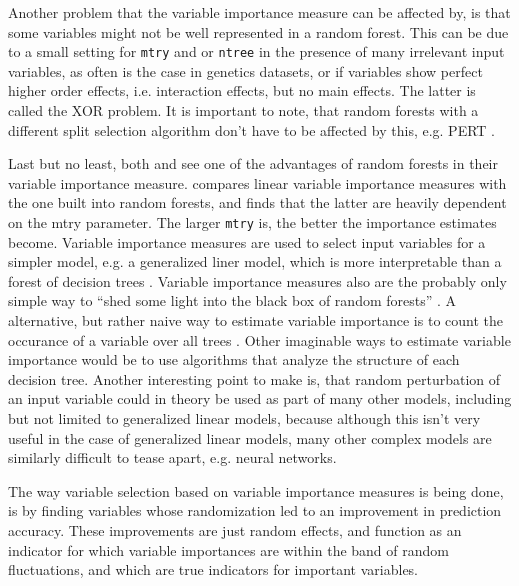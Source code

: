 \documentclass[a4paper,man,12pt,apacite,floatsintext,draftfirst]{apa6} %
\begin{document}
Another problem that the variable importance measure can be affected by,
is that some variables might not be well represented in a random forest.
This can be due to a small setting for \texttt{mtry} and or \texttt{ntree}
in the presence of many irrelevant input variables, as often is the case
in genetics datasets, or if variables show perfect higher order effects,
i.e. interaction effects, but no main effects.
The latter is called the XOR problem.
It is important to note, that random forests with a different split selection
algorithm don't have to be affected by this, e.g. PERT \cite{cutler2001pert}.

Last but no least, both \cite{strobl2009introduction} and
\cite{gromping2009variable} see one of the advantages of random forests in
their variable importance measure.
\cite{gromping2009variable} compares linear variable importance measures
with the one built into random forests, and finds that the latter are
heavily dependent on the mtry parameter.
The larger \texttt{mtry} is, the better the importance estimates become.
Variable importance measures are used to select input variables for a simpler
model, e.g. a generalized liner model, which is more interpretable than a
forest of decision trees \cite{strobl2009introduction}.
Variable importance measures also are the probably only simple way to
“shed some light into the black box of random forests”
\cite{gromping2009variable}.
A alternative, but rather naive way to estimate variable importance is to count
the occurance of a variable over all trees \cite{strobl2009introduction}.
Other imaginable ways to estimate variable importance would be to use
algorithms that analyze the structure of each decision tree.
Another interesting point to make is, that random perturbation of an input
variable could in theory be used as part of many other models, including but
not limited to generalized linear models, because although
this isn't very useful in the case of generalized linear models,
many other complex models are similarly difficult to tease apart, e.g.
neural networks.

The way variable selection based on variable importance measures is
being done, is by finding variables whose randomization led to an improvement
in prediction accuracy.
These improvements are just random effects, and function as an indicator
for which variable importances are within the band of random fluctuations,
and which are true indicators for important variables.
\end{document}
